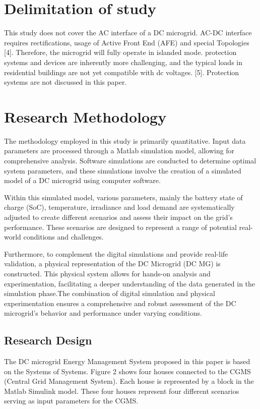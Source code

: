 \section{Delimitation of study}
This study does not cover the AC interface of a DC microgrid. AC-DC interface requires rectifications, usage of Active Front End (AFE) and special Topologies [4]. Therefore, the microgrid will fully operate in islanded mode. protection systems and devices are inherently more challenging, and the typical loads in residential buildings are not yet compatible with dc voltages. [5]. Protection systems are not discussed in this paper.

\section{Research Methodology}
The methodology employed in this study is primarily quantitative. Input data parameters are processed through a Matlab simulation model, allowing for comprehensive analysis. Software simulations are conducted to determine optimal system parameters, and these simulations involve the creation of a simulated model of a DC microgrid using computer software.\par
Within this simulated model, various parameters, mainly the battery state of charge (SoC), temperature, irradiance and load demand are systematically adjusted to create different scenarios and assess their impact on the grid's performance. These scenarios are designed to represent a range of potential real-world conditions and challenges.\par
Furthermore, to complement the digital simulations and provide real-life validation, a physical representation of the DC Microgrid (DC MG) is constructed. This physical system allows for hands-on analysis and experimentation, facilitating a deeper understanding of the data generated in the simulation phase.The combination of digital simulation and physical experimentation ensures a comprehensive and robust assessment of the DC microgrid's behavior and performance under varying conditions.

\subsection{Research Design}
The DC microgrid Energy Management System proposed in this paper is based on the Systems of Systems. Figure 2 shows four houses connected to the CGMS (Central Grid Management System). Each house is represented by a block in the Matlab Simulink model. These four houses represent four different scenarios serving as input parameters for the CGMS.

